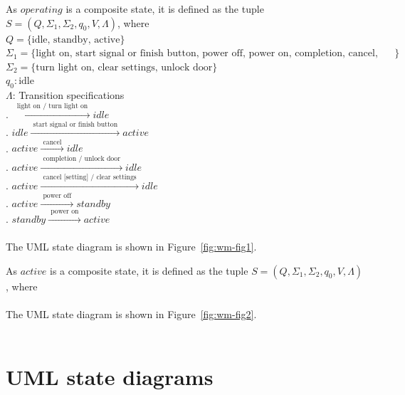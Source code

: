 \documentclass[12pt]{article}
\begin{document}
\begin{spacing}{1.5}
\noindent As $operating$ is a composite state, it is defined as the tuple $S = (Q, \Sigma_1, \Sigma_2, q_0, V, \Lambda)$, where\\
\noindent $Q = \{\text {idle, standby, active}\}$\\
\noindent $\Sigma_1 = \{\text {light on, start signal or finish button, power off, power on, completion, cancel, cancel [setting]}\}$\\ 
\noindent $\Sigma_2 = \{\text {turn light on, clear settings, unlock door}\}$\\
\noindent $q_0: \text{idle}$\\
\noindent $\Lambda$: Transition specifications\\
. $\xrightarrow {\text { light on / turn light on }} idle$\\
. $idle \xrightarrow {\text { start signal or finish button }} active$\\
. $active \xrightarrow {\text { cancel }} idle$\\
. $active \xrightarrow {\text { completion / unlock door }} idle$\\
. $active \xrightarrow {\text { cancel [setting] / clear settings }} idle$\\
. $active \xrightarrow {\text { power off }} standby$\\
. $standby \xrightarrow {\text { power on }} active$\\\\
\noindent The UML state diagram is shown in Figure~\ref{fig:wm-fig1}.\\
\newpage

\noindent As $active$ is a composite state, it is defined as the tuple $S = (Q, \Sigma_1, \Sigma_2, q_0, V, \Lambda)$, where\\\\
\noindent The UML state diagram is shown in Figure~\ref{fig:wm-fig2}.\\\\
\newpage

\section{UML state diagrams}


\end{spacing}
\end{document}
